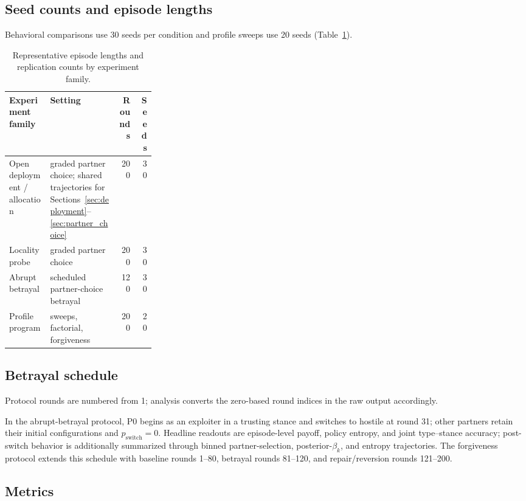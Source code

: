 \subsection{Seed counts and episode lengths}

Behavioral comparisons use 30 seeds per condition and profile sweeps use 20 seeds (Table~\ref{tab:protocol_scales}).

\begin{table}[H]
\centering
\small
\caption{Representative episode lengths and replication counts by experiment family.}
\label{tab:protocol_scales}
\begin{tabularx}{\linewidth}{@{}>{\raggedright\arraybackslash}p{0.28\linewidth}Xrr@{}}
\toprule
Experiment family & Setting & Rounds & Seeds \\
\midrule
Open deployment / allocation & graded partner choice; shared trajectories for Sections~\ref{sec:deployment}--\ref{sec:partner_choice} & 200 & 30 \\
Locality probe & graded partner choice & 200 & 30 \\
Abrupt betrayal & scheduled partner-choice betrayal & 120 & 30 \\
Profile program & sweeps, factorial, forgiveness & 200 & 20 \\
\bottomrule
\end{tabularx}
\end{table}

\subsection{Betrayal schedule}

Protocol rounds are numbered from 1; analysis converts the zero-based round indices in the raw output accordingly.

In the abrupt-betrayal protocol, P0 begins as an exploiter in a trusting stance and switches to hostile at round 31; other partners retain their initial configurations and $p_{\mathrm{switch}}=0$. Headline readouts are episode-level payoff, policy entropy, and joint type--stance accuracy; post-switch behavior is additionally summarized through binned partner-selection, posterior-$\beta_k$, and entropy trajectories. The forgiveness protocol extends this schedule with baseline rounds 1--80, betrayal rounds 81--120, and repair/reversion rounds 121--200.

\subsection{Metrics}

